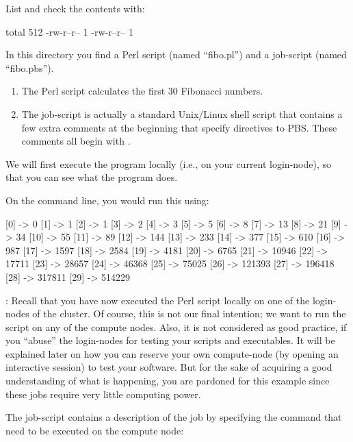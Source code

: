 List and check the contents with:

\begin{prompt}
total 512
-rw-r--r-- 1 %
-rw-r--r-- 1 %
\end{prompt}

In this directory you find a Perl script (named ``fibo.pl'') and a job-script
(named ``fibo.pbs'').

\begin{enumerate}
\item  The Perl script calculates the first 30 Fibonacci numbers.
\item  The job-script is actually a standard Unix/Linux shell script that
  contains a few extra comments at the beginning that specify directives to
  PBS.  These comments all begin with .
\end{enumerate}

We will first execute the program locally (i.e., on your current login-node),
so that you can see what the program does.

On the command line, you would run this using:
\begin{prompt}
[0] -> 0
[1] -> 1
[2] -> 1
[3] -> 2
[4] -> 3
[5] -> 5
[6] -> 8
[7] -> 13
[8] -> 21
[9] -> 34
[10] -> 55
[11] -> 89
[12] -> 144
[13] -> 233
[14] -> 377
[15] -> 610
[16] -> 987
[17] -> 1597
[18] -> 2584
[19] -> 4181
[20] -> 6765
[21] -> 10946
[22] -> 17711
[23] -> 28657
[24] -> 46368
[25] -> 75025
[26] -> 121393
[27] -> 196418
[28] -> 317811
[29] -> 514229
\end{prompt}

: Recall that you have now executed the Perl script locally on
one of the login-nodes of the \hpc cluster.  Of course, this is not our final
intention; we want to run the script on any of the compute nodes. Also, it is
not considered as good practice, if you ``abuse'' the login-nodes for testing
your scripts and executables. It will be explained later on how you can
reserve your own compute-node (by opening an interactive session) to test
your software. But for the sake of acquiring a good understanding of what is
happening, you are pardoned for this example since these jobs require very little
computing power.

The job-script contains a description of the job by specifying the command that
need to be executed on the compute node:


